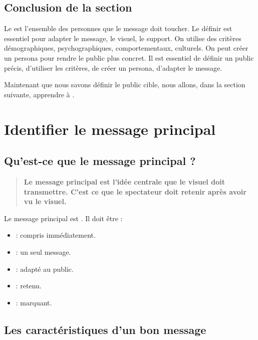 \subsection*{Conclusion de la section}

Le  est l'ensemble des personnes que le message doit toucher. Le définir est essentiel pour adapter le message, le visuel, le support. On utilise des critères démographiques, psychographiques, comportementaux, culturels. On peut créer un persona pour rendre le public plus concret. Il est essentiel de définir un public précis, d'utiliser les critères, de créer un persona, d'adapter le message.

Maintenant que nous savons définir le public cible, nous allons, dans la section suivante, apprendre à .

\section{Identifier le message principal}

\subsection{Qu'est-ce que le message principal ?}

\begin{quote}
\textbf{Le message principal est l'idée centrale que le visuel doit transmettre. C'est ce que le spectateur doit retenir après avoir vu le visuel.}
\end{quote}

Le message principal est . Il doit être :

\begin{itemize}
    \item {} : compris immédiatement.
    \item {} : un seul message.
    \item {} : adapté au public.
    \item {} : retenu.
    \item {} : marquant.
\end{itemize}

\subsection{Les caractéristiques d'un bon message}

